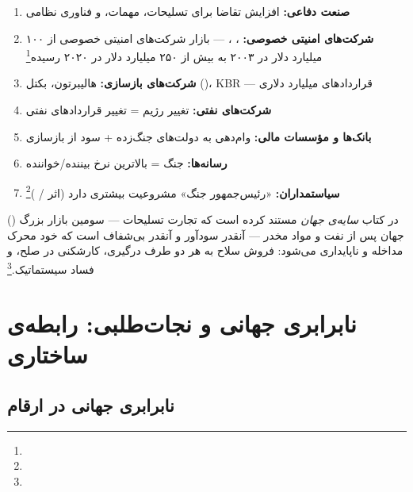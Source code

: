 \begin{tcolorbox}[wavebox, title={برندگان اقتصادی مداخله‌ی خارجی}]
\begin{enumerate}
\item \textbf{صنعت دفاعی:} افزایش تقاضا برای تسلیحات، مهمات، و فناوری نظامی
\item \textbf{شرکت‌های امنیتی خصوصی:} ، ،  — بازار شرکت‌های امنیتی خصوصی از ۱۰۰ میلیارد دلار در ۲۰۰۳ به بیش از ۲۵۰ میلیارد دلار در ۲۰۲۰ رسیده\footnote{}
\item \textbf{شرکت‌های بازسازی:} هالیبرتون، بکتل ()، KBR — قراردادهای میلیارد دلاری
\item \textbf{شرکت‌های نفتی:} تغییر رژیم = تغییر قراردادهای نفتی
\item \textbf{بانک‌ها و مؤسسات مالی:} وام‌دهی به دولت‌های جنگ‌زده + سود از بازسازی
\item \textbf{رسانه‌ها:} جنگ = بالاترین نرخ بیننده/خواننده
\item \textbf{سیاستمداران:} «رئیس‌جمهور جنگ» مشروعیت بیشتری دارد (اثر  / )\footnote{}
\end{enumerate}
\end{tcolorbox}

 () در کتاب \textit{سایه‌ی جهان} مستند کرده است که تجارت تسلیحات — سومین بازار بزرگ جهان پس از نفت و مواد مخدر — آنقدر سودآور و آنقدر بی‌شفاف است که خود محرک مداخله و ناپایداری می‌شود: فروش سلاح به هر دو طرف درگیری، کارشکنی در صلح، و فساد سیستماتیک.\footnote{}


\section{نابرابری جهانی و نجات‌طلبی: رابطه‌ی ساختاری}
\label{sec:ch12-inequality}

\subsection{نابرابری جهانی در ارقام}
\label{subsec:ch12-inequality-data}


